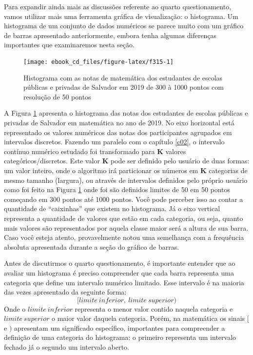 \documentclass[
  portuguese,
  oneside]{book}
\begin{document}
Para expandir ainda mais as discussões referente ao quarto questionamento, vamos utilizar mais uma ferramenta gráfica de visualização: o histograma. Um histograma de um conjunto de dados numéricos se parece muito com um gráfico de barras apresentado anteriormente, embora tenha algumas diferenças importantes que examinaremos nesta seção.

\begin{figure}

{\centering \texttt{[image: ebook\_cd\_files/figure-latex/f315-1]} 

}

\caption{Histograma com as notas de matemática dos estudantes de escolas públicas e privadas de Salvador em 2019 de 300 à 1000 pontos com resolução de 50 pontos}\label{fig:f315}
\end{figure}

A Figura \ref{fig:f315} apresenta o histograma das notas dos estudantes de escolas públicas e privadas de Salvador em matemática no ano de 2019. No eixo horizontal está representado os valores numéricos das notas dos participantes agrupados em intervalos discretos. Fazendo um paralelo com o capítulo \ref{c02}, o intervalo contínuo numérico estudado foi transformado para \textbf{K} valores categóricos/discretos. Este valor \textbf{K} pode ser definido pelo usuário de duas formas: um valor inteiro, onde o algoritmo irá particionar os números em \textbf{K} categorias de mesmo tamanho (largura), ou através de intervalos definidos pelo próprio usuário como foi feito na Figura \ref{fig:f315} onde foi são definidos limites de 50 em 50 pontos começando em 300 pontos até 1000 pontos. Você pode perceber isso ao contar a quantidade de ``caixinhas'' que existem no histograma. Já o eixo vertical representa a quantidade de valores que estão em cada categoria, ou seja, quanto mais valores são representados por aquela classe maior será a altura de sua barra. Caso você esteja atento, provavelmente notou uma semelhança com a frequência absoluta apresentada durante a seção do gráfico de barras.

Antes de discutirmos o quarto questionamento, é importante entender que ao avaliar um histograma é preciso compreender que cada barra representa uma categoria que define um intervalo numérico limitado. Esse intervalo é na maioria das vezes apresentado da seguinte forma:
\[[limite\ inferior,\ limite\ superior)\]
Onde o \(limite\ inferior\) representa o menor valor contido naquela categoria e \(limite\ superior\) o maior valor daquela categoria. Porém, na matemática os sinais \([\) e \()\) apresentam um significado específico, importantes para compreender a definição de uma categoria do histograma: o primeiro representa um intervalo fechado já o segundo um intervalo aberto.
\end{document}
